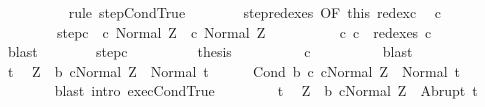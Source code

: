 \begin{isabellebody}
\ \ \ \ \ \ \ \ \isamarkupfalse%
\ {\isacharparenleft}rule\ step{\isachardot}CondTrue{\isacharparenright}\isanewline
\ \ \ \ \ \ \isamarkupfalse%
\ step{\isacharunderscore}redexes\ {\isacharbrackleft}OF\ this\ redex{\isacharunderscore}c{\isacharprime}{\isacharbrackright}\ \isamarkupfalse%
\ c{\isacharprime}{\isacharprime}\ \isanewline
\ \ \ \ \ \ \ \ step{\isacharunderscore}c{\isacharprime}{\isacharprime}{\isacharcolon}\ {\isachardoublequoteopen}{\isasymGamma}{\isasymturnstile}\ {\isacharparenleft}c{\isacharprime}{\isacharcomma}\ Normal\ Z{\isacharparenright}\ {\isasymrightarrow}\ {\isacharparenleft}c{\isacharprime}{\isacharprime}{\isacharcomma}\ Normal\ Z{\isacharparenright}{\isachardoublequoteclose}\ \ \isanewline
\ \ \ \ \ \ \ \ c{}{\isacharcolon}\ {\isachardoublequoteopen}c{}\ {\isasymin}\ redexes\ c{\isacharprime}{\isacharprime}{\isachardoublequoteclose}\isanewline
\ \ \ \ \ \ \ \ \isamarkupfalse%
\ blast\isanewline
\ \ \ \ \ \ \isamarkupfalse%
\ step{\isacharunderscore}c{\isacharprime}{\isacharprime}\isanewline
\ \ \ \ \ \ \isamarkupfalse%
\ \isamarkupfalse%
\ {\isacharquery}thesis\isanewline
\ \ \ \ \ \ \ \ \isamarkupfalse%
\ c{}\isanewline
\ \ \ \ \ \ \ \ \isamarkupfalse%
\ blast\isanewline
\ \ \ \ \isamarkupfalse%
\isanewline
\ \ \isamarkupfalse%
\isanewline
\ \ \ \ \isamarkupfalse%
\ t\ \isamarkupfalse%
\ {\isachardoublequoteopen}Z\ {\isasymin}\ b{\isachardoublequoteclose}\ {\isachardoublequoteopen}{\isasymGamma}{\isasymturnstile}{\isasymlangle}c{}{\isacharcomma}Normal\ Z{\isasymrangle}\ {\isasymRightarrow}\ Normal\ t{\isachardoublequoteclose}\isanewline
\ \ \ \ \isamarkupfalse%
\ {\isachardoublequoteopen}{\isasymGamma}{\isasymturnstile}{\isasymlangle}Cond\ b\ c{}\ c{}{\isacharcomma}Normal\ Z{\isasymrangle}\ {\isasymRightarrow}\ Normal\ t{\isachardoublequoteclose}\isanewline
\ \ \ \ \ \ \isamarkupfalse%
\ {\isacharparenleft}blast\ intro{\isacharcolon}\ exec{\isachardot}CondTrue{\isacharparenright}\isanewline
\ \ \isamarkupfalse%
\isanewline
\ \ \ \ \isamarkupfalse%
\ t\ \isamarkupfalse%
\ {\isachardoublequoteopen}Z\ {\isasymin}\ b{\isachardoublequoteclose}\ {\isachardoublequoteopen}{\isasymGamma}{\isasymturnstile}{\isasymlangle}c{}{\isacharcomma}Normal\ Z{\isasymrangle}\ {\isasymRightarrow}\ Abrupt\ t{\isachardoublequoteclose}\isanewline

\end{isabellebody}
